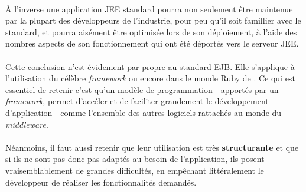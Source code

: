 {  \paragraph{} À l'inverse une application JEE standard pourra non seulement être maintenue par la
  plupart des développeurs de l'industrie, pour peu qu'il soit famillier avec le standard, et pourra
  aisément être optimisée lors de son déploiement, à l'aide des nombres aspects de son
  fonctionnement qui ont été déportés vers le serveur JEE.

  \paragraph{} Cette conclusion n'est évidement par propre au standard EJB. Elle s'applique à
  l'utilisation du célèbre \textit{framework}  ou encore dans le monde Ruby de
  . Ce qui est essentiel de retenir c'est qu'un modèle de programmation
  - apportés par un \textit{framework}, permet d'accéler et de faciliter grandement le développement
  d'application - comme l'ensemble des autres logiciels rattachés au monde du \textit{middleware}.

  \paragraph{} Néanmoins, il faut aussi retenir que leur utilisation est très \textbf{structurante}
  et que si ils ne sont pas donc pas adaptés au besoin de l'application, ils posent
  vraisemblablement de grandes difficultés, en empêchant littéralement le développeur de réaliser
  les fonctionnalités demandés.
}
